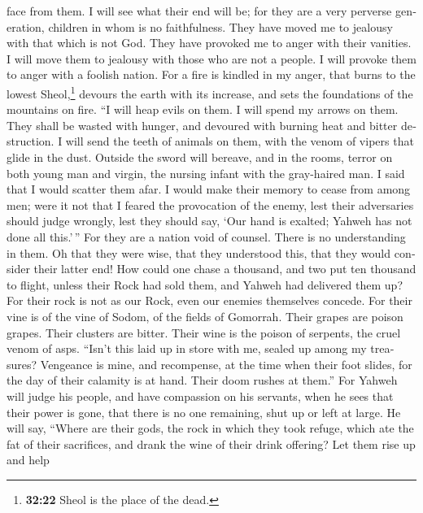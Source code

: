 \begin{paracol}{2}
\begin{otherlanguage}{english}
face from them. I will see what their end will be; for they are a very
perverse generation, children in whom is no faithfulness.
 They have moved me to jealousy with that which is not
God. They have provoked me to anger with their vanities. I will move
them to jealousy with those who are not a people. I will provoke them to
anger with a foolish nation.  For a fire is kindled in my
anger, that burns to the lowest Sheol,\footnote{\textbf{32:22} Sheol is
  the place of the dead.} devours the earth with its increase, and sets
the foundations of the mountains on fire.  ``I will heap
evils on them. I will spend my arrows on them.  They
shall be wasted with hunger, and devoured with burning heat and bitter
destruction. I will send the teeth of animals on them, with the venom of
vipers that glide in the dust.  Outside the sword will
bereave, and in the rooms, terror on both young man and virgin, the
nursing infant with the gray-haired man.  I said that I
would scatter them afar. I would make their memory to cease from among
men;  were it not that I feared the provocation of the
enemy, lest their adversaries should judge wrongly, lest they should
say, `Our hand is exalted; Yahweh has not done all this.'\,''
 For they are a nation void of counsel. There is no
understanding in them.  Oh that they were wise, that they
understood this, that they would consider their latter end!
 How could one chase a thousand, and two put ten thousand
to flight, unless their Rock had sold them, and Yahweh had delivered
them up?  For their rock is not as our Rock, even our
enemies themselves concede.  For their vine is of the
vine of Sodom, of the fields of Gomorrah. Their grapes are poison
grapes. Their clusters are bitter.  Their wine is the
poison of serpents, the cruel venom of asps.  ``Isn't
this laid up in store with me, sealed up among my treasures?
 Vengeance is mine, and recompense, at the time when
their foot slides, for the day of their calamity is at hand. Their doom
rushes at them.''  For Yahweh will judge his people, and
have compassion on his servants, when he sees that their power is gone,
that there is no one remaining, shut up or left at large.
 He will say, ``Where are their gods, the rock in which
they took refuge,  which ate the fat of their sacrifices,
and drank the wine of their drink offering? Let them rise up and help

\end{otherlanguage}
\end{paracol}

